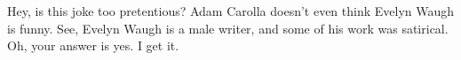 \item Hey, is this joke too pretentious? Adam Carolla doesn't even
  think Evelyn Waugh is funny. See, Evelyn Waugh is a male writer, and
  some of his work was satirical. Oh, your answer is yes. I get it.